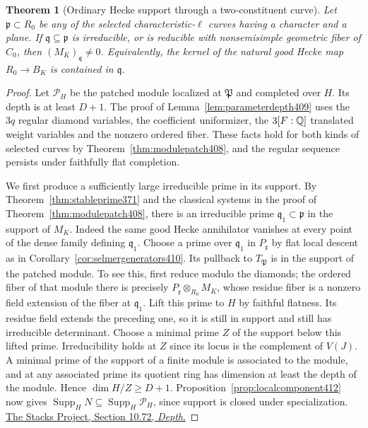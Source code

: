 \documentclass[a4paper,11pt]{article}
\newtheorem{theorem}[proposition]{Theorem}
\theoremstyle{definition}
\theoremstyle{remark}
\numberwithin{equation}{section}
\begin{document}
\begin{theorem}[Ordinary Hecke support through a two-constituent curve]\leavevmode
\label{thm:reduciblepropagation412}
Let \(\mathfrak p\subset R_0\) be any of the selected
characteristic-\(\ell\) curves having a character and a
plane. If \(\mathfrak q\subseteq\mathfrak p\) is irreducible,
or is reducible with nonsemisimple geometric fiber of
\(C_0\), then \((M_K)_{\mathfrak q}\ne0\). Equivalently,
the kernel of the natural good Hecke map \(R_0\to B_K\)
is contained in \(\mathfrak q\).
\end{theorem}
\begin{proof}
Let \(\mathcal P_H\) be the patched module localized at
\(\mathfrak P\) and completed over \(H\). Its depth is
at least \(D+1\). The proof of
Lemma~\ref{lem:parameterdepth409} uses the \(3q\) regular
diamond variables, the coefficient uniformizer, the \(3[F:\mathbb Q]\)
translated weight variables and the nonzero ordered fiber.
These facts hold for both kinds of selected curves by
Theorem~\ref{thm:modulepatch408}, and the regular sequence
persists under faithfully flat completion.

We first produce a sufficiently large irreducible prime in
its support. By Theorem~\ref{thm:stableprime371} and the
classical systems in the proof of
Theorem~\ref{thm:modulepatch408}, there is an irreducible
prime \(\mathfrak q_1\subset\mathfrak p\) in the support
of \(M_K\). Indeed the same good Hecke annihilator
vanishes at every point of the dense family defining
\(\mathfrak q_1\). Choose a prime over \(\mathfrak q_1\)
in \(P_{\mathfrak x}\) by flat local descent as in
Corollary~\ref{cor:selmergenerators410}. Its pullback to
\(T_{\mathfrak P}\) is in the support of the patched
module. To see this, first reduce modulo the diamonds;
the ordered fiber of that module there is precisely
\(P_{\mathfrak x}\otimes_{R_0}M_K\), whose residue fiber
is a nonzero field extension of the fiber at
\(\mathfrak q_1\). Lift this prime to \(H\) by faithful
flatness. Its residue field extends the preceding one, so
it is still in support and still has irreducible determinant.
Choose a minimal prime \(Z\) of the support below this
lifted prime. Irreducibility holds at \(Z\) since its
locus is the complement of \(V(J)\). A minimal prime of
the support of a finite module is associated to the module,
and at any associated prime its quotient ring has dimension
at least the depth of the module. Hence \(\dim H/Z\ge D+1\).
Proposition~\ref{prop:localcomponent412} now gives
\(\operatorname{Supp}_H N\subseteq\operatorname{Supp}_H\mathcal P_H\),
since support is closed under specialization.
\href{https://stacks.math.columbia.edu/tag/00LE}
{The Stacks Project, Section 10.72, \emph{Depth}.}


\end{proof}
\end{document}
